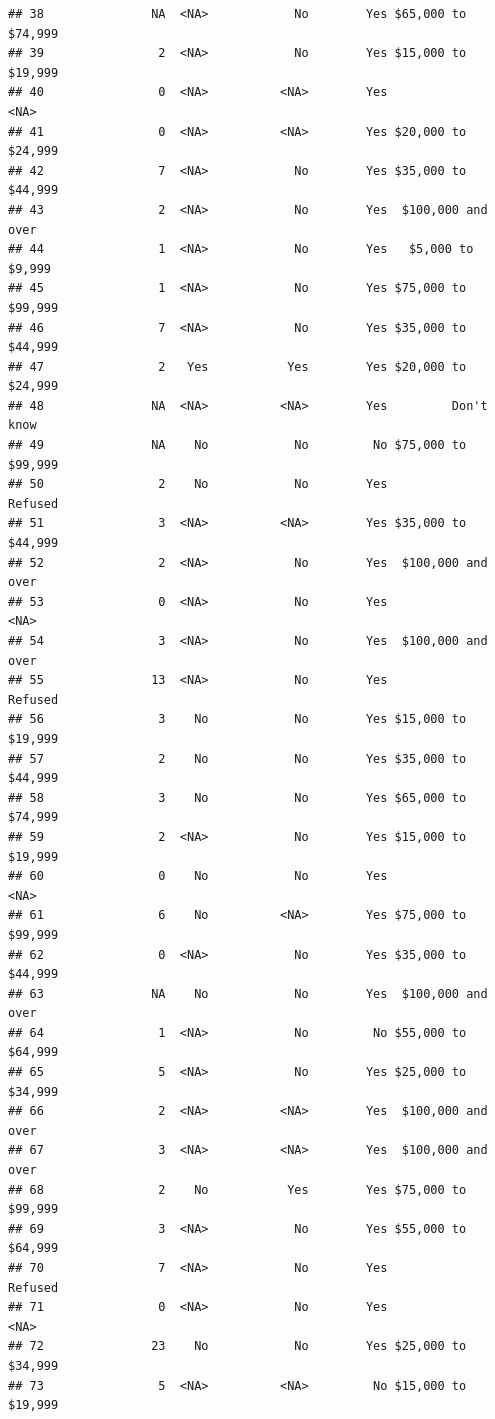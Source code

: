 \documentclass[man]{apa6}
\begin{document}
\begin{verbatim}
## 38               NA  <NA>            No        Yes $65,000 to $74,999
## 39                2  <NA>            No        Yes $15,000 to $19,999
## 40                0  <NA>          <NA>        Yes               <NA>
## 41                0  <NA>          <NA>        Yes $20,000 to $24,999
## 42                7  <NA>            No        Yes $35,000 to $44,999
## 43                2  <NA>            No        Yes  $100,000 and over
## 44                1  <NA>            No        Yes   $5,000 to $9,999
## 45                1  <NA>            No        Yes $75,000 to $99,999
## 46                7  <NA>            No        Yes $35,000 to $44,999
## 47                2   Yes           Yes        Yes $20,000 to $24,999
## 48               NA  <NA>          <NA>        Yes         Don't know
## 49               NA    No            No         No $75,000 to $99,999
## 50                2    No            No        Yes            Refused
## 51                3  <NA>          <NA>        Yes $35,000 to $44,999
## 52                2  <NA>            No        Yes  $100,000 and over
## 53                0  <NA>            No        Yes               <NA>
## 54                3  <NA>            No        Yes  $100,000 and over
## 55               13  <NA>            No        Yes            Refused
## 56                3    No            No        Yes $15,000 to $19,999
## 57                2    No            No        Yes $35,000 to $44,999
## 58                3    No            No        Yes $65,000 to $74,999
## 59                2  <NA>            No        Yes $15,000 to $19,999
## 60                0    No            No        Yes               <NA>
## 61                6    No          <NA>        Yes $75,000 to $99,999
## 62                0  <NA>            No        Yes $35,000 to $44,999
## 63               NA    No            No        Yes  $100,000 and over
## 64                1  <NA>            No         No $55,000 to $64,999
## 65                5  <NA>            No        Yes $25,000 to $34,999
## 66                2  <NA>          <NA>        Yes  $100,000 and over
## 67                3  <NA>          <NA>        Yes  $100,000 and over
## 68                2    No           Yes        Yes $75,000 to $99,999
## 69                3  <NA>            No        Yes $55,000 to $64,999
## 70                7  <NA>            No        Yes            Refused
## 71                0  <NA>            No        Yes               <NA>
## 72               23    No            No        Yes $25,000 to $34,999
## 73                5  <NA>          <NA>         No $15,000 to $19,999

\end{verbatim}
\end{document}
